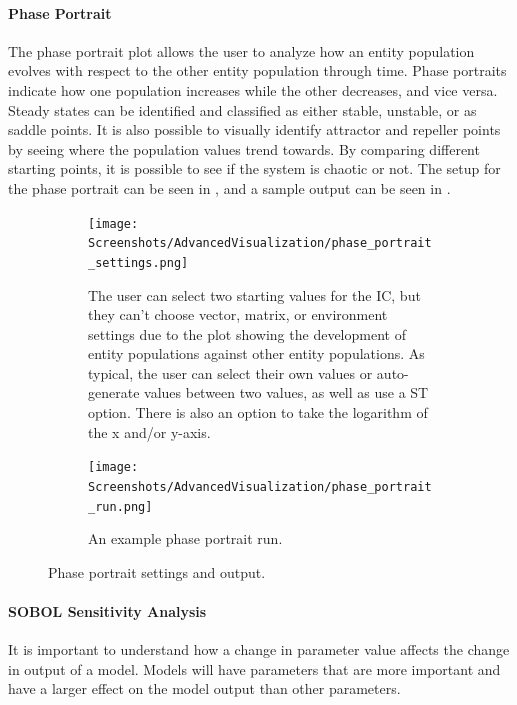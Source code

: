 \paragraph{Phase Portrait}
\label{sec:phase_portrait}
The phase portrait plot allows the user to analyze how an entity population evolves with respect to the other entity population through time.
Phase portraits indicate how one population increases while the other decreases, and vice versa.
Steady states can be identified and classified as either stable, unstable, or as saddle points. 
It is also possible to visually identify attractor and repeller points by seeing where the population values trend towards. 
By comparing different starting points, it is possible to see if the system is chaotic or not.
The setup for the phase portrait can be seen in , and a sample output can be seen in . 

\begin{figure}[h!]
    \centering
    \begin{subfigure}{0.49\linewidth}
        \centering
        \captionsetup{width=1\linewidth}
        \texttt{[image: Screenshots/AdvancedVisualization/phase\_portrait\_settings.png]}
        \caption{
            The user can select two starting values for the IC, but they can't choose vector, matrix, or environment settings due to the plot showing the development of entity populations against other entity populations.
            As typical, the user can select their own values or auto-generate values between two values, as well as use a ST option.
            There is also an option to take the logarithm of the x and/or y-axis. 
        }
        \label{fig:ss:av:phase_portrait_settings}
    \end{subfigure}
    \hfill
    \begin{subfigure}{0.49\linewidth}
        \centering
        \captionsetup{width=1\linewidth}
        \texttt{[image: Screenshots/AdvancedVisualization/phase\_portrait\_run.png]}
        \caption{
            An example phase portrait run. 
        }
        \label{fig:ss:av:phase_portrait_run}
    \end{subfigure}
    \caption{Phase portrait settings and output. }
\end{figure}

\paragraph{SOBOL Sensitivity Analysis}
\label{sec:SOBOL_sensitivity_analysis}
It is important to understand how a change in parameter value affects the change in output of a model. 
Models will have parameters that are more important and have a larger effect on the model output than other parameters. 

